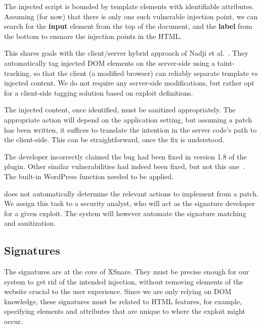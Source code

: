 The injected script is bounded by template elements with identifiable
attributes. Assuming (for now) that there is only one such vulnerable
injection point, we can search for the \textbf{input} element from the
top of the document, and the \textbf{label} from the bottom to ensnare
the injection points in the HTML.

This shares goals with the client/server hybrid approach of Nadji et
al.~\cite{Nadji:2009}. They automatically tag injected DOM elements on the
server-side using a taint-tracking, so that the client (a
modified browser) can reliably separate template vs
injected content. We do not require any server-side modifications, but rather opt for a client-side tagging solution based on exploit definitions.

The injected content, once identified, must be sanitized appropriately.
The appropriate action will depend on the application setting, but
assuming a patch has been written, it suffices to translate the
intention in the server code's path to the client-side.
This can be straightforward, once the fix is understood.

The developer incorrectly claimed the bug had
been fixed in version 1.8 of the plugin.
Other similar vulnerabilities had indeed been fixed, but not this one~\cite{rccpatch}. The built-in WordPress function  needed to be applied.

\xss does not automatically determine the relevant actions to
implement from a patch. We assign this task to a security
analyst, who will act as the signature developer for a given
exploit. The system will however automate the signature matching and
sanitization.


\subsection{\sys Signatures} \label{signatures}
The signatures are at the core of XSnare. They must be precise enough for our system to get rid of the intended injection, without removing elements of the website crucial to the user experience. Since we are only relying on DOM knowledge, these signatures must be related to HTML features, for example, specifying elements and attributes that are unique to where the exploit might occur. 

